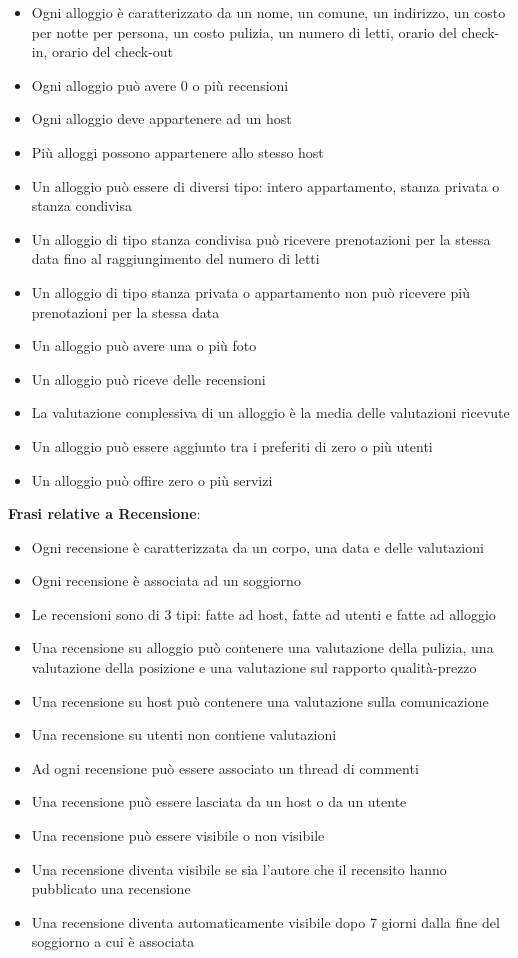 \documentclass[letterpaper]{report}
\begin{document}
\begin{itemize}
    \item Ogni alloggio è caratterizzato da un nome, un comune, un indirizzo, un costo per notte per persona, un costo pulizia, un numero di letti, orario del check-in, orario del check-out
    \item Ogni alloggio può avere 0 o più recensioni
    \item Ogni alloggio deve appartenere ad un host
    \item Più alloggi possono appartenere allo stesso host
    \item Un alloggio può essere di diversi tipo: intero appartamento, stanza privata o stanza condivisa
    \item Un alloggio di tipo stanza condivisa può ricevere prenotazioni per la stessa data fino al raggiungimento del numero di letti
    \item Un alloggio di tipo stanza privata o appartamento non può ricevere più prenotazioni per la stessa data
    \item Un alloggio può avere una o più foto
    \item Un alloggio può riceve delle recensioni
    \item La valutazione complessiva di un alloggio è la media delle valutazioni ricevute
    \item Un alloggio può essere aggiunto tra i preferiti di zero o più utenti
    \item Un alloggio può offire zero o più servizi
\end{itemize}
\bigskip
\textbf{Frasi relative a Recensione}:
\begin{itemize}
    \item Ogni recensione è caratterizzata da un corpo, una data e delle valutazioni
    \item Ogni recensione è associata ad un soggiorno
    \item Le recensioni sono di 3 tipi: fatte ad host, fatte ad utenti e fatte ad alloggio
    \item Una recensione su alloggio può contenere una valutazione della pulizia, una valutazione della posizione e una valutazione sul rapporto qualità-prezzo
    \item Una recensione su host può contenere una valutazione sulla comunicazione
    \item Una recensione su utenti non contiene valutazioni
    \item Ad ogni recensione può essere associato un thread di commenti
    \item Una recensione può essere lasciata da un host o da un utente
    \item Una recensione può essere visibile o non visibile
    \item Una recensione diventa visibile se sia l'autore che il recensito hanno pubblicato una recensione
    \item Una recensione diventa automaticamente visibile dopo 7 giorni dalla fine del soggiorno a cui è associata
\end{itemize}
\end{document}
